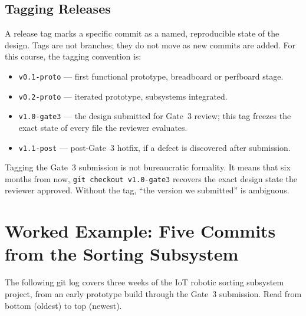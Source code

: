 \subsection{Tagging Releases}
\label{subsec:ch13-tagging}

A release tag marks a specific commit as a
named, reproducible state of the design.
Tags are not branches; they do not move as new commits are added.
For this course, the tagging convention is:

\begin{itemize}
  \item \texttt{v0.1-proto} --- first functional prototype, breadboard or perfboard stage.
  \item \texttt{v0.2-proto} --- iterated prototype, subsystems integrated.
  \item \texttt{v1.0-gate3} --- the design submitted for Gate~3 review; this tag freezes
        the exact state of every file the reviewer evaluates.
  \item \texttt{v1.1-post} --- post-Gate~3 hotfix, if a defect is discovered after
        submission.
\end{itemize}

Tagging the Gate~3 submission is not bureaucratic formality.
It means that six months from now, \texttt{git checkout v1.0-gate3} recovers the exact
design state the reviewer approved.
Without the tag, ``the version we submitted'' is ambiguous.

\section{Worked Example: Five Commits from the Sorting Subsystem}
\label{sec:ch13-worked-example}

The following git log covers three weeks of the IoT robotic sorting subsystem project,
from an early prototype build through the Gate~3 submission.
Read from bottom (oldest) to top (newest).

